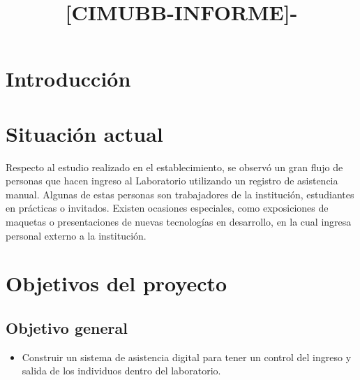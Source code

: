 \documentclass{templateReport}
\newcounter{contador}
\begin{document}
\setcounter{contador}{1}


\title{[CIMUBB-INFORME]-\titulo}
\author{
    \integrantes
    \supervisor
}

\portada %
\margenes %

\tableofcontents %
\listoffigures %
\listoftables %

\newpage
\section{Introducción}
\section{Situación actual}
Respecto al estudio realizado en el establecimiento, se observó un gran flujo de personas que hacen ingreso al Laboratorio utilizando un registro de asistencia manual. Algunas de estas personas son trabajadores de la institución, estudiantes en prácticas o invitados. Existen ocasiones especiales, como exposiciones de maquetas o presentaciones de nuevas tecnologías en desarrollo, en la cual ingresa personal externo a la institución.

\section{Objetivos del proyecto}
\subsection{Objetivo general}
\begin{itemize}
    \item Construir un sistema de asistencia digital para tener un control del ingreso y salida de los individuos dentro del laboratorio.
\end{itemize}
\end{document}
